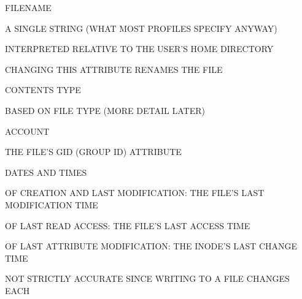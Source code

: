 \begin{bwslide}

\begin{nrtc}
\item	FILENAME
    \begin{nrtc}
    \item	A SINGLE STRING (WHAT MOST PROFILES SPECIFY ANYWAY)

    \item	INTERPRETED RELATIVE TO THE USER'S HOME DIRECTORY 

    \item	CHANGING THIS ATTRIBUTE RENAMES THE FILE
    \end{nrtc}

\item	CONTENTS TYPE
    \begin{nrtc}
    \item	BASED ON FILE TYPE (MORE DETAIL LATER)
    \end{nrtc}

\item	ACCOUNT
    \begin{nrtc}
    \item	THE FILE'S GID (GROUP ID) ATTRIBUTE
    \end{nrtc}

\item	DATES AND TIMES
    \begin{nrtc}\small
    \item	OF CREATION AND LAST MODIFICATION: THE FILE'S LAST MODIFICATION
		TIME

    \item	OF LAST READ ACCESS: THE FILE'S LAST ACCESS TIME

    \item	OF LAST ATTRIBUTE MODIFICATION: THE INODE'S LAST CHANGE TIME

    \item	NOT STRICTLY ACCURATE SINCE WRITING TO A FILE CHANGES EACH
    \end{nrtc}
\end{nrtc}
\end{bwslide}


